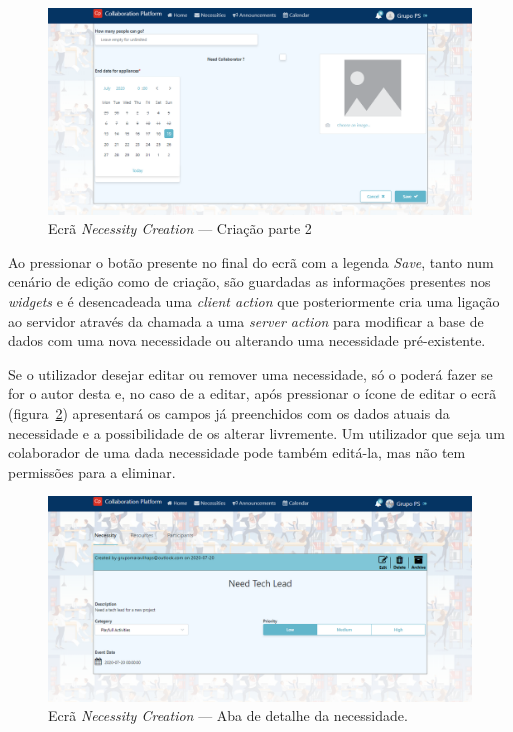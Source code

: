 \begin{figure}[H]
  \centering 
  \includegraphics[scale=0.3]{figures/NecessityCreation2.png}
  \caption{Ecrã \textit{Necessity Creation} --- Criação parte 2}\label{fig:necessityCreation2}
\end{figure}


Ao pressionar o botão presente no final do ecrã com a legenda \textit{Save}, tanto num cenário de edição como de criação, 
são guardadas as informações presentes nos \textit{widgets} e é desencadeada uma \textit{client action} que posteriormente cria uma ligação ao servidor através da chamada a uma \textit{server action} para modificar a base de dados com uma nova necessidade ou alterando uma necessidade pré-existente.

Se o utilizador desejar editar ou remover uma necessidade, só o poderá fazer se for o autor desta e, no caso de a editar, após pressionar o ícone de editar o ecrã (figura~\ref{fig:NecessityCreationWithResourcesAndParticipants}) apresentará os campos já preenchidos com os dados atuais da necessidade e a possibilidade de os alterar livremente.
Um utilizador que seja um colaborador de uma dada necessidade pode também editá-la, mas não tem permissões para a eliminar.

\begin{figure}[H]
  \centering 
  \includegraphics[scale=0.4]{figures/NecessityCreationWithResourcesAndParticipants.png}
  \caption{Ecrã \textit{Necessity Creation} --- Aba de detalhe da necessidade.}\label{fig:NecessityCreationWithResourcesAndParticipants}
\end{figure}


